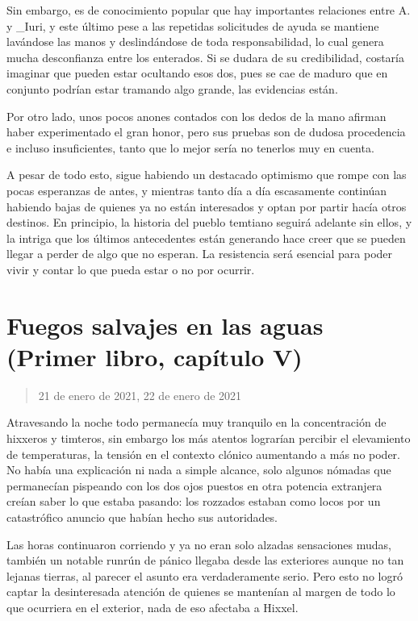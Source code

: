 \documentclass[
]{book}
\begin{document}
Sin embargo, es de conocimiento popular que hay importantes relaciones entre A. y \_Iuri, y este último pese a las repetidas solicitudes de ayuda se mantiene lavándose las manos y deslindándose de toda responsabilidad, lo cual genera mucha desconfianza entre los enterados. Si se dudara de su credibilidad, costaría imaginar que pueden estar ocultando esos dos, pues se cae de maduro que en conjunto podrían estar tramando algo grande, las evidencias están.

Por otro lado, unos pocos anones contados con los dedos de la mano afirman haber experimentado el gran honor, pero sus pruebas son de dudosa procedencia e incluso insuficientes, tanto que lo mejor sería no tenerlos muy en cuenta.

A pesar de todo esto, sigue habiendo un destacado optimismo que rompe con las pocas esperanzas de antes, y mientras tanto día a día escasamente continúan habiendo bajas de quienes ya no están interesados y optan por partir hacía otros destinos. En principio, la historia del pueblo temtiano seguirá adelante sin ellos, y la intriga que los últimos antecedentes están generando hace creer que se pueden llegar a perder de algo que no esperan. La resistencia será esencial para poder vivir y contar lo que pueda estar o no por ocurrir.

\hypertarget{fuegos-salvajes-en-las-aguas-primer-libro-capuxedtulo-v}{%
\section{Fuegos salvajes en las aguas (Primer libro, capítulo V)}\label{fuegos-salvajes-en-las-aguas-primer-libro-capuxedtulo-v}}

\begin{quote}
21 de enero de 2021, 22 de enero de 2021
\end{quote}

Atravesando la noche todo permanecía muy tranquilo en la concentración de hixxeros y timteros, sin embargo los más atentos lograrían percibir el elevamiento de temperaturas, la tensión en el contexto clónico aumentando a más no poder. No había una explicación ni nada a simple alcance, solo algunos nómadas que permanecían pispeando con los dos ojos puestos en otra potencia extranjera creían saber lo que estaba pasando: los rozzados estaban como locos por un catastrófico anuncio que habían hecho sus autoridades.

Las horas continuaron corriendo y ya no eran solo alzadas sensaciones mudas, también un notable runrún de pánico llegaba desde las exteriores aunque no tan lejanas tierras, al parecer el asunto era verdaderamente serio. Pero esto no logró captar la desinteresada atención de quienes se mantenían al margen de todo lo que ocurriera en el exterior, nada de eso afectaba a Hixxel.
\end{document}
